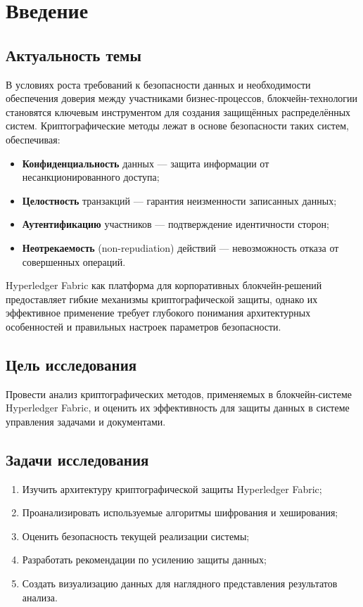\documentclass[a4paper,14pt]{extreport}
\begin{document}
\tableofcontents
\newpage

\chapter{Введение}

\section{Актуальность темы}

В условиях роста требований к безопасности данных и необходимости обеспечения доверия между участниками бизнес-процессов, блокчейн-технологии становятся ключевым инструментом для создания защищённых распределённых систем. Криптографические методы лежат в основе безопасности таких систем, обеспечивая:

\begin{itemize}
    \item \textbf{Конфиденциальность} данных --- защита информации от несанкционированного доступа;
    \item \textbf{Целостность} транзакций --- гарантия неизменности записанных данных;
    \item \textbf{Аутентификацию} участников --- подтверждение идентичности сторон;
    \item \textbf{Неотрекаемость} (non-repudiation) действий --- невозможность отказа от совершенных операций.
\end{itemize}

Hyperledger Fabric как платформа для корпоративных блокчейн-решений предоставляет гибкие механизмы криптографической защиты, однако их эффективное применение требует глубокого понимания архитектурных особенностей и правильных настроек параметров безопасности.

\section{Цель исследования}

Провести анализ криптографических методов, применяемых в блокчейн-системе Hyperledger Fabric, и оценить их эффективность для защиты данных в системе управления задачами и документами.

\section{Задачи исследования}

\begin{enumerate}
    \item Изучить архитектуру криптографической защиты Hyperledger Fabric;
    \item Проанализировать используемые алгоритмы шифрования и хеширования;
    \item Оценить безопасность текущей реализации системы;
    \item Разработать рекомендации по усилению защиты данных;
    \item Создать визуализацию данных для наглядного представления результатов анализа.
\end{enumerate}
\end{document}
